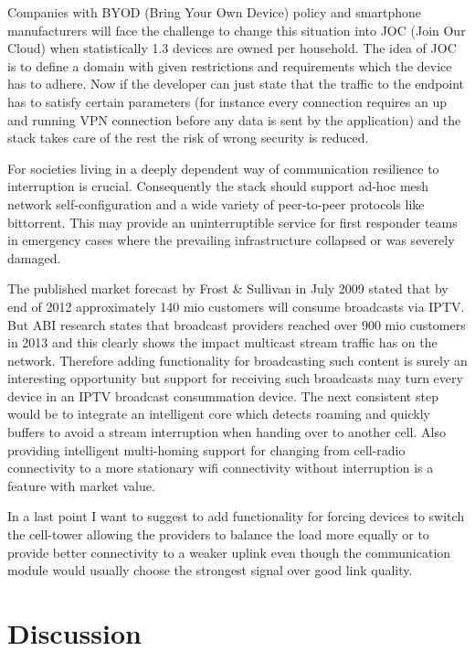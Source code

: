 \documentclass[twocolumn,english]{IEEEtran}
\theoremstyle{plain}
\theoremstyle{plain}
\begin{document}
Companies with BYOD (Bring Your Own Device) policy and smartphone
manufacturers will face the challenge to change this situation into JOC (Join
Our Cloud) when statistically 1.3 devices are owned per
household\cite{gartner:predicts-2014-cognizant-computing}. The idea of JOC is
to define a domain with given restrictions and requirements which the device
has to adhere. Now if the developer can just state that the traffic to the
endpoint has to satisfy certain parameters (for instance every connection
requires an up and running VPN connection before any data is sent by the
application) and the stack takes care of the rest the risk of wrong security
is reduced.

For societies living in a deeply dependent way of communication resilience to
interruption is crucial. Consequently the stack should support ad-hoc mesh
network self-configuration and a wide variety of peer-to-peer protocols like
bittorrent. This may provide an uninterruptible service for first responder
teams in emergency cases where the prevailing infrastructure collapsed or was
severely damaged.

The published market forecast by Frost \& Sullivan in July
2009\cite{frost:iptv-market} stated that by end of 2012 approximately 140 mio
customers will consume broadcasts via IPTV. But ABI research states that
broadcast providers reached over 900 mio customers in
2013\cite{abi:iptv-marketshare} and this clearly shows the impact multicast
stream traffic has on the network.  Therefore adding functionality for
broadcasting such content is surely an interesting opportunity but support for
receiving such broadcasts may turn every device in an IPTV broadcast
consummation device. The next consistent step would be to integrate an
intelligent core which detects roaming and quickly buffers to avoid a stream
interruption when handing over to another cell. Also providing intelligent
multi-homing support for changing from cell-radio connectivity to a more
stationary wifi connectivity without interruption is a feature with market
value.

In a last point I want to suggest to add functionality for forcing devices to
switch the cell-tower allowing the providers to balance the load more equally
or to provide better connectivity to a weaker uplink even though the
communication module would usually choose the strongest signal over good link
quality.

\section{Discussion}
\end{document}
